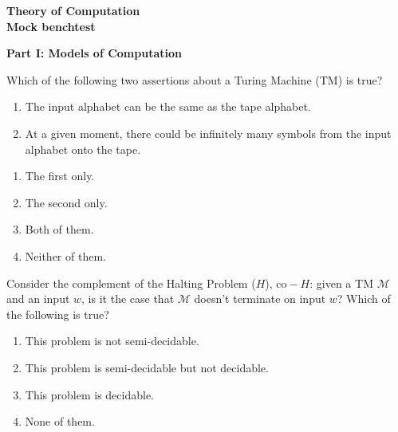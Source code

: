 \documentclass[10pt]{article}
\begin{document}
\begin{center}
{\large \bf Theory of Computation\\[3pt]  Mock benchtest}
\end{center}

\bigskip 

\begin{center}
{\large \bf Part I: Models of Computation}
\end{center}



\bigskip \noindent  Which of the following two assertions about a Turing Machine (TM) is true? 
\begin{enumerate} 
\item[(i)] The input alphabet can be the same as the tape alphabet. 
\item[(ii)] At a given moment, there could be infinitely many symbols 
from the input alphabet onto the tape. 
\end{enumerate}

\begin{enumerate}[{\bf (A)}]
\addtolength{\itemsep}{-5pt}
\item The first only. 
\item The second only. 
\item Both of them. 
\item Neither of them. 
\end{enumerate}

\bigskip



\bigskip \noindent  Consider the complement of the Halting Problem ($H$), $\mathrm{co-}H$: 
given a TM ${\mathcal M}$ and an input $w$, is it the case that ${\mathcal M}$ 
doesn't terminate on input $w$? Which of the following is true? 

\begin{enumerate}[{\bf (A)}]
\addtolength{\itemsep}{-5pt} 
\item This problem is not semi-decidable. 
\item This problem is semi-decidable but not decidable. 
\item This problem is decidable. 
\item None of them. 
\end{enumerate}
\end{document}
